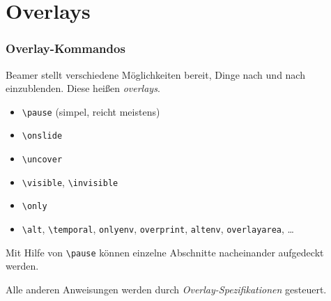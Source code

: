 \section{Overlays}

\begin{slide}
  \frametitle{Overlay-Kommandos}

  \onslide<+->

  Beamer stellt verschiedene Möglichkeiten bereit, Dinge nach und nach einzublenden. Diese heißen \textit{overlays}.

  \onslide<+->

  \begin{itemize}
  \item \lstinline{\pause} (simpel, reicht meistens)
  \item \lstinline{\onslide}
  \item \lstinline{\uncover}
  \item \lstinline{\visible}, \lstinline{\invisible}
  \item \lstinline{\only}
  \item \lstinline{\alt}, \lstinline{\temporal}, \lstinline{onlyenv},
    \lstinline{overprint}, \lstinline{altenv}, \lstinline{overlayarea}, \dots
  \end{itemize}

  \onslide<+->

  Mit Hilfe von \lstinline{\pause} können einzelne Abschnitte nacheinander aufgedeckt
  werden.

  \onslide<+->

  Alle anderen Anweisungen werden durch \emph{Overlay-Spezifikationen} gesteuert.

\end{slide}

